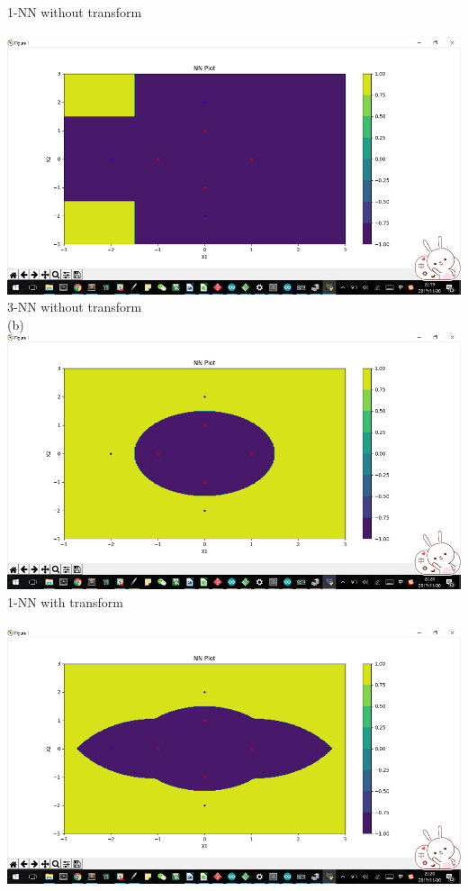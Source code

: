 \documentclass[12pt]{article}
\begin{document}
1-NN without transform\\\\
\includegraphics[scale=0.9]{images/3nn_no_tran}\\
3-NN without transform\\
(b)\\
\includegraphics[scale=0.9]{images/1nn_yes_tran}\\
1-NN with transform\\\\
\includegraphics[scale=0.9]{images/3nn_yes_tran}\\
\end{document}
